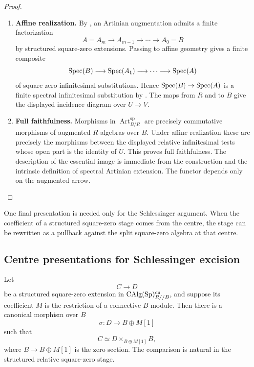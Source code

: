\begin{proof}
\leavevmode
\begin{enumerate}[label=\textup{(\arabic*)}]
    \item \textbf{Affine realization.}
    By , an Artinian augmentation
    admits a finite factorization
    \[
        A=A_m\longrightarrow A_{m-1}\longrightarrow\cdots\longrightarrow A_0=B
    \]
    by structured square-zero extensions. Passing to affine geometry
    gives a finite composite
    \[
        \operatorname{Spec}(B)\longrightarrow\operatorname{Spec}(A_1)\longrightarrow\cdots
        \longrightarrow\operatorname{Spec}(A)
    \]
    of square-zero infinitesimal substitutions. Hence
    \(\operatorname{Spec}(B)\to\operatorname{Spec}(A)\) is a finite spectral infinitesimal substitution by
    . The maps from \(R\) and
    to \(B\) give the displayed incidence diagram over \(U\to V\).
    \item \textbf{Full faithfulness.}
        Morphisms in \(\operatorname{Art}^{\mathrm{sp}}_{B/R}\) are precisely
        commutative morphisms of augmented \(R\)-algebras over \(B\). Under affine
    realization these are precisely the morphisms between the displayed relative
        infinitesimal tests whose open part is the identity of \(U\). This proves full
        faithfulness. The description of the essential image is immediate from the
        construction and the intrinsic definition of spectral Artinian extension.
        The functor depends only on the augmented arrow.
\end{enumerate}
\end{proof}




One final presentation is needed only for the Schlessinger argument. When the
coefficient of a structured square-zero stage comes from the centre, the stage can be
rewritten as a pullback against the split square-zero algebra at that centre.

\subsection{Centre presentations for Schlessinger excision}

\begin{lemma}
\label{lem:square-zero-centre-presentation}
Let
\[
    C\longrightarrow D
\]
be a structured square-zero extension in
\(\operatorname{CAlg}(\operatorname{Sp})^{\mathrm{cn}}_{R//B}\), and suppose its coefficient \(M\) is the
restriction of a connective \(B\)-module. Then there is a canonical morphism
over \(B\)
\[
    \sigma:D\longrightarrow B\oplus M[1]
\]
such that
\[
    C\simeq D\times_{B\oplus M[1]}B,
\]
where \(B\to B\oplus M[1]\) is the zero section. The comparison is natural
in the structured relative square-zero stage.
\end{lemma}

